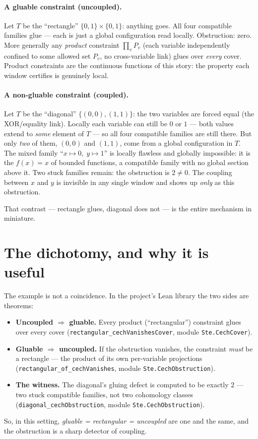 \documentclass[11pt]{article}
\newcommand{\code}[1]{\texttt{#1}}
\begin{document}
\paragraph{A gluable constraint (uncoupled).}
Let $T$ be the ``rectangle'' $\{0,1\}\times\{0,1\}$: anything goes.  All
four compatible families glue --- each is just a global configuration
read locally.  Obstruction: zero.  More generally any \emph{product}
constraint $\prod_v P_v$ (each variable independently confined to some
allowed set $P_v$, no cross-variable link) glues over \emph{every}
cover.  Product constraints are the continuous functions of this story:
the property each window certifies is genuinely local.

\paragraph{A non-gluable constraint (coupled).}
Let $T$ be the ``diagonal'' $\{(0,0),(1,1)\}$: the two variables are
forced equal (the XOR/equality link).  Locally each variable can still
be $0$ or $1$ --- both values extend to \emph{some} element of $T$ ---
so all four compatible families are still there.  But only \emph{two}
of them, $(0,0)$ and $(1,1)$, come from a global configuration in $T$.
The mixed family ``$x\mapsto 0,\; y\mapsto 1$'' is locally flawless and
globally impossible: it is the $f(x)=x$ of bounded functions, a
compatible family with no global section above it.  Two stuck families
remain: the obstruction is $2\neq 0$.  The coupling between $x$ and $y$
is invisible in any single window and shows up \emph{only} as this
obstruction.

That contrast --- rectangle glues, diagonal does not --- is the entire
mechanism in miniature.

\section{The dichotomy, and why it is useful}
The example is not a coincidence.  In the project's Lean library the two
sides are theorems:
\begin{itemize}
\item \textbf{Uncoupled $\Rightarrow$ gluable.}  Every product
  (``rectangular'') constraint glues over every cover
  (\code{rectangular\_cechVanishesCover}, module \code{Ste.CechCover}).
\item \textbf{Gluable $\Rightarrow$ uncoupled.}  If the obstruction
  vanishes, the constraint \emph{must} be a rectangle --- the product
  of its own per-variable projections
  (\code{rectangular\_of\_cechVanishes}, module
  \code{Ste.CechObstruction}).
\item \textbf{The witness.}  The diagonal's gluing defect is computed
  to be exactly $2$ --- two stuck compatible families, not two
  cohomology classes (\code{diagonal\_cechObstruction}, module
  \code{Ste.CechObstruction}).
\end{itemize}
So, in this setting, \emph{gluable = rectangular = uncoupled} are one
and the same, and the obstruction is a sharp detector of coupling.
\end{document}
